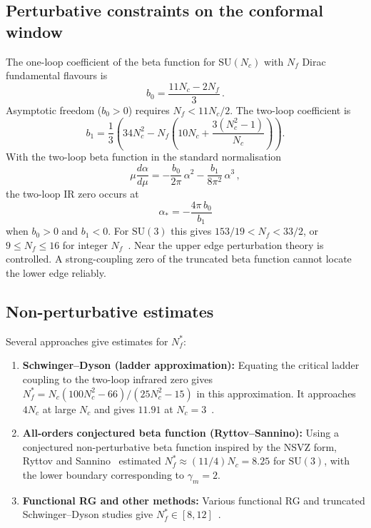 \documentclass[11pt,a4paper]{article}
\theoremstyle{plain}
\theoremstyle{definition}
\theoremstyle{remark}
\newcommand{\Nc}{N_{\!c}}
\newcommand{\Nf}{N_{\!f}}
\newcommand{\Nfstar}{\Nf^*}
\newcommand{\SU}[1]{\mathrm{SU}(#1)}
\begin{document}
\subsection{Perturbative constraints on the conformal window}

The one-loop coefficient of the beta function for $\SU{\Nc}$ with
$\Nf$ Dirac fundamental flavours is
\begin{equation}\label{eq:b0}
  b_0 = \frac{11\Nc - 2\Nf}{3}\,.
\end{equation}
Asymptotic freedom ($b_0 > 0$) requires $\Nf < 11\Nc/2$.  The
two-loop coefficient is
\begin{equation}\label{eq:b1}
  b_1 = \frac{1}{3}\left(
    34\Nc^2 - \Nf\left(10\Nc + \frac{3(\Nc^2 - 1)}{\Nc}\right)
  \right).
\end{equation}
With the two-loop beta function in the standard normalisation
\begin{equation}\label{eq:beta-2loop}
  \mu\frac{d\alpha}{d\mu} = -\frac{b_0}{2\pi}\,\alpha^2
  - \frac{b_1}{8\pi^2}\,\alpha^3\,,
\end{equation}
the two-loop IR zero occurs at
\begin{equation}\label{eq:alpha-BZ}
  \alpha_* = -\frac{4\pi\, b_0}{b_1}
\end{equation}
when $b_0>0$ and $b_1<0$.  For $\SU{3}$ this gives
$153/19<\Nf<33/2$, or $9\leq\Nf\leq16$ for integer
$\Nf$~\cite{BZ1982,Caswell1974}.  Near the upper edge perturbation
theory is controlled.  A strong-coupling zero of the truncated beta
function cannot locate the lower edge reliably.

\subsection{Non-perturbative estimates}

Several approaches give estimates for $\Nfstar$:

\begin{enumerate}[label=(\roman*)]
  \item \textbf{Schwinger--Dyson (ladder approximation):}
    Equating the critical ladder coupling to the two-loop infrared
    zero gives $\Nfstar=\Nc(100\Nc^2-66)/(25\Nc^2-15)$ in this
    approximation. It approaches $4\Nc$ at large $\Nc$ and gives
    $11.91$ at $\Nc=3$~\cite[Eq.~(12)]{ATW1996}.

  \item \textbf{All-orders conjectured beta function
    (Ryttov--Sannino):}  Using a conjectured non-perturbative beta
    function inspired by the NSVZ form, Ryttov and
    Sannino~\cite{RS2008} estimated $\Nfstar \approx (11/4)\Nc = 8.25$
    for $\SU{3}$, with the lower boundary corresponding to
    $\gamma_m = 2$.

  \item \textbf{Functional RG and other methods:}  Various functional
    RG and truncated Schwinger--Dyson studies give
    $\Nfstar \in [8, 12]$~\cite{Gies2006,Braun2010}.
\end{enumerate}
\end{document}
